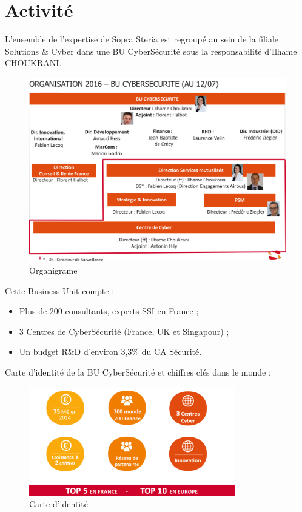 \documentclass[a4paper]{memoir}
\begin{document}
\newpage

\section*{Activité}

L’ensemble de l’expertise de Sopra Steria est regroupé au sein de la filiale Solutions \& Cyber dans une BU CyberSécurité sous la responsabilité d’Ilhame CHOUKRANI.

\begin{figure}[!ht]
\center
\includegraphics[width=1\textwidth]{./images/sopra4.png}
\caption{Organigrame}
\label{Organigrame}
\end{figure}

Cette Business Unit compte : 

\begin{itemize}
\item Plus de 200 consultants, experts SSI en France ;
\item 3 Centres de CyberSécurité (France, UK et Singapour) ;
\item Un budget R\&D d'environ 3,3\% du CA Sécurité.
\end{itemize}

Carte d’identité de la BU CyberSécurité et chiffres clés dans le monde :

\begin{figure}[!ht]
\center
\includegraphics[width=0.8\textwidth]{./images/sopra5.png}
\caption{Carte d'identité}
\label{ID}
\end{figure}
\end{document}
